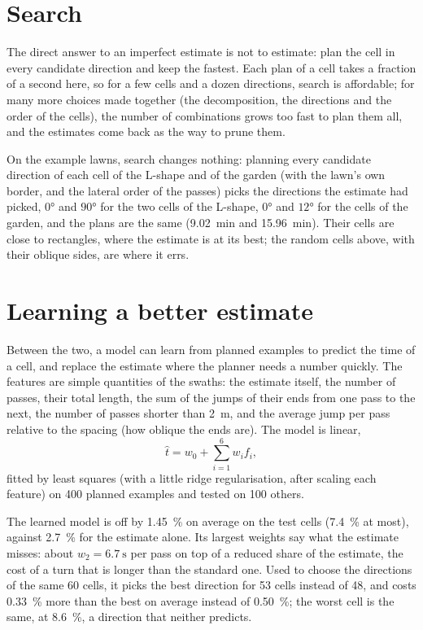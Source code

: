 \section{Search}

The direct answer to an imperfect estimate is not to estimate: plan the
cell in every candidate direction and keep the fastest. Each plan of a cell
takes a fraction of a second here, so for a few cells and a dozen
directions, search is affordable; for many more choices made together (the
decomposition, the directions and the order of the cells), the number of
combinations grows too fast to plan them all, and the estimates come back
as the way to prune them.

On the example lawns, search changes nothing: planning every candidate
direction of each cell of the L-shape and of the garden (with the lawn's
own border, and the lateral order of the passes) picks the directions the
estimate had picked, $0°$ and $90°$ for the two cells of the L-shape, $0°$
and $12°$ for the cells of the garden, and the plans are the same
(\SI{9.02}{\minute} and \SI{15.96}{\minute}). Their cells are close to
rectangles, where the estimate is at its best; the random cells above,
with their oblique sides, are where it errs.

\section{Learning a better estimate}

Between the two, a model can learn from planned examples to predict the
time of a cell, and replace the estimate where the planner needs a number
quickly. The features are simple quantities of the swaths: the estimate
itself, the number of passes, their total length, the sum of the jumps of
their ends from one pass to the next, the number of passes shorter than
\SI{2}{\metre}, and the average jump per pass relative to the spacing (how
oblique the ends are). The model is linear,
\[
  \hat t = w_0 + \sum_{i=1}^{6} w_i f_i ,
\]
fitted by least squares (with a little ridge regularisation, after scaling
each feature) on 400 planned examples and tested on 100 others.

The learned model is off by \SI{1.45}{\percent} on average on the test
cells (\SI{7.4}{\percent} at most), against \SI{2.7}{\percent} for the
estimate alone. Its largest weights say what the estimate misses: about
$w_2 = \SI{6.7}{\second}$ per pass on top of a reduced share of the
estimate, the cost of a turn that is longer than the standard one. Used to
choose the directions of the same 60 cells, it picks the best direction for
53 cells instead of 48, and costs \SI{0.33}{\percent} more than the best on
average instead of \SI{0.50}{\percent}; the worst cell is the same, at
\SI{8.6}{\percent}, a direction that neither predicts.

